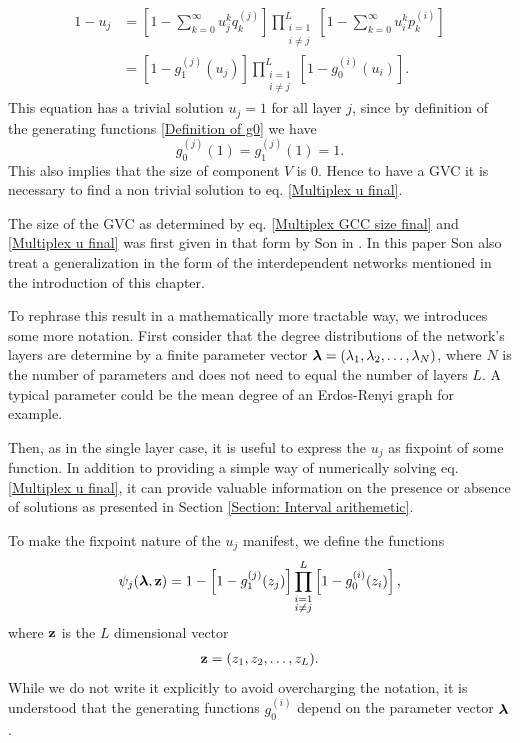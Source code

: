 \documentclass[
11pt, %
american, %
singlespacing, %
final, %
nolistspacing, %
liststotoc, %
headsepline, %
]{MastersDoctoralThesis} %
\begin{document}
\begin{align}
	1 - u_j &= \left[1 - \sum_{k = 0}^{\infty} u_j^k q_k^{(j)} \right] \prod_{\substack{i = 1 \\ i \neq j}}^{L}  \left[1 - \sum_{k = 0}^{\infty} u_i^k p^{(i)}_k \right] \\
	&= \left[1 - g_1^{(j)}(u_j) \right] \prod_{\substack{i = 1 \\ i \neq j}}^{L}  \left[1 - g_0^{(i)}(u_i) \right]. \label{Multiplex u final}
\end{align}
This equation has a trivial solution $u_j = 1$ for all layer $j$, since by definition of the generating functions \eqref{Definition of g0} we have
\begin{equation}
	g_0^{(j)}(1) = g_1^{(j)}(1) = 1.
\end{equation}
This also implies that the size of component $V$ is $0$. Hence to have a GVC it is necessary to find a non trivial solution to eq. \eqref{Multiplex u final}.

The size of the GVC as determined by eq. \eqref{Multiplex GCC size final} and \eqref{Multiplex u final} was first given in that form by Son \etal{} in \cite{son2012percolation}. In this paper Son \etal{} also treat a generalization in the form of the interdependent networks mentioned in the introduction of this chapter.

To rephrase this result in a mathematically more tractable way, we introduces some more notation. First consider that the degree distributions of the network's layers are determine by a finite parameter vector $\boldsymbol{\mathrm{\lambda}} = (\lambda_1, \lambda_2, \dots, \lambda_N)$, where $N$ is the number of parameters and does not need to equal the number of layers $L$. A typical parameter could be the mean degree of an Erdos-Renyi graph for example.


Then, as in the single layer case, it is useful to express the $u_j$ as fixpoint of some function. In addition to providing a simple way of numerically solving eq. \eqref{Multiplex u final}, it can provide valuable information on the presence or absence of solutions as presented in Section \ref{Section: Interval arithemetic}.

To make the fixpoint nature of the $u_j$ manifest, we define the functions
\begin{align}
	\psi_j(\boldsymbol{\mathrm{\lambda}}, \boldsymbol{\mathrm{z}}) = 1 - \left[1 - g_1^{(j)}(z_j) \right] \prod_{\substack{i = 1 \\ i \neq j}}^{L}  \left[1 - g_0^{(i)}(z_i) \right], \label{Definition of psi functions}
\end{align}
where $\boldsymbol{\mathrm{z}}$ is the $L$ dimensional vector
\begin{align}
	\boldsymbol{\mathrm{z}} = (z_1, z_2, \dots, z_L).
\end{align}
While we do not write it explicitly to avoid overcharging the notation, it is understood that the generating functions $g_0^{(i)}$ depend on the parameter vector $\boldsymbol{\mathrm{\lambda}}$.
\end{document}
